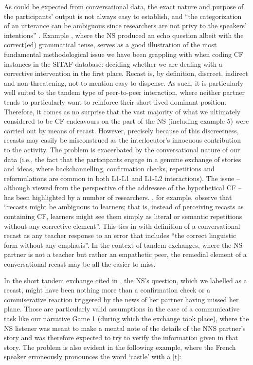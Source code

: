 \documentclass[output=paper,colorlinks,citecolor=brown,modfonts,nonflat]{../langscibook}
\begin{document}
As could be expected from conversational data, the exact nature and purpose of the participants’ output is not always easy to establish, and “the categorization of an utterance can be ambiguous since researchers are not privy to the speakers’ intentions” \citep[44]{Ballinger2015}. Example , where the NS produced an echo question albeit with the correct(ed) grammatical tense, serves as a good illustration of the most fundamental methodological issue we have been grappling with when coding CF instances in the SITAF database: deciding whether we are dealing with a corrective intervention in the first place. Recast is, by definition, discreet, indirect and non-threatening, not to mention easy to dispense. As such, it is particularly well suited to the tandem type of peer-to-peer interaction, where neither partner tends to particularly want to reinforce their short-lived dominant position. Therefore, it comes as no surprise that the vast majority of what we ultimately considered to be CF endeavours on the part of the NS (including example 5) were carried out by means of recast. However, precisely because of this discreetness, recasts may easily be misconstrued as the interlocutor’s innocuous contribution to the activity. The problem is exacerbated by the conversational nature of our data (i.e., the fact that the participants engage in a genuine exchange of stories and ideas, where backchannelling, confirmation checks, repetitions and reformulations are common in both L1-L1 and L1-L2 interactions). The issue – although viewed from the perspective of the addressee of the hypothetical CF – has been highlighted by a number of researchers. \citet[209]{CarpenterEtAl2006}, for example, observe that “recasts might be ambiguous to learners; that is, instead of perceiving recasts as containing CF, learners might see them simply as literal or semantic repetitions without any corrective element”. This ties in with  definition of a conversational recast as any teacher response to an error that includes “the correct linguistic form without any emphasis”. In the context of tandem exchanges, where the NS partner is not a teacher but rather an empathetic peer, the remedial element of a conversational recast may be all the easier to miss.



In the short tandem exchange cited in , the NS’s question, which we labelled as a recast, might have been nothing more than a confirmation check or a commiserative reaction triggered by the news of her partner having missed her plane. Those are particularly valid assumptions in the case of a communicative task like our narrative Game 1 (during which the exchange took place), where the NS listener was meant to make a mental note of the details of the NNS partner’s story and was therefore expected to try to verify the information given in that story. The problem is also evident in the following example, where the French speaker erroneously pronounces the word ‘castle’ with a [t]:
\end{document}

